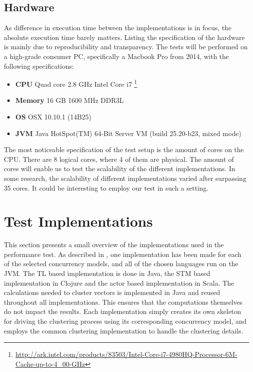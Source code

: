\subsection{Hardware}\label{subsec:hardware}
As difference in execution time between the implementations is in focus, the absolute execution time barely matters. Listing the specification of the hardware is mainly due to reproducibility and transparency.
The tests will be performed on a high-grade consumer PC, specifically a Macbook Pro from 2014, with the following specifications:
\begin{itemize}
	\item \textbf{CPU} Quad core 2.8 GHz Intel Core i7 \footnote{\url{http://ark.intel.com/products/83503/Intel-Core-i7-4980HQ-Processor-6M-Cache-up-to-4_00-GHz}}
	\item \textbf{Memory} 16 GB 1600 MHz DDR3L
	\item \textbf{\ac{OS}} OSX 10.10.1 (14B25)
	\item \textbf{\ac{JVM}} Java HotSpot(TM) 64-Bit Server VM (build 25.20-b23, mixed mode)
\end{itemize}

The most noticeable specification of the test setup is the amount of cores on the \ac{CPU}. There are 8 logical cores, where 4 of them are physical. The amount of cores will enable us to test the scalability of the different implementations. In some research\cite{harris2003language}, the scalability of different implementations varied after surpassing 35 cores. It could be interesting to employ our test in such a setting.

\section{Test Implementations}
This section presents a small overview of the implementations used in the performance test. As described in , one implementation has been made for each of the selected concurrency models, and all of the chosen languages run on the \ac{JVM}. The \ac{TL} based implementation is done in Java, the \ac{STM} based implementation in Clojure and the actor based implementation in Scala. The calculations needed to cluster vectors is implemented in Java and reused throughout all implementations. This ensures that the computations themselves do not impact the results. Each implementation simply creates its own skeleton for driving the clustering process using its corresponding concurrency model, and employs the common clustering implementation to handle the clustering details. 

